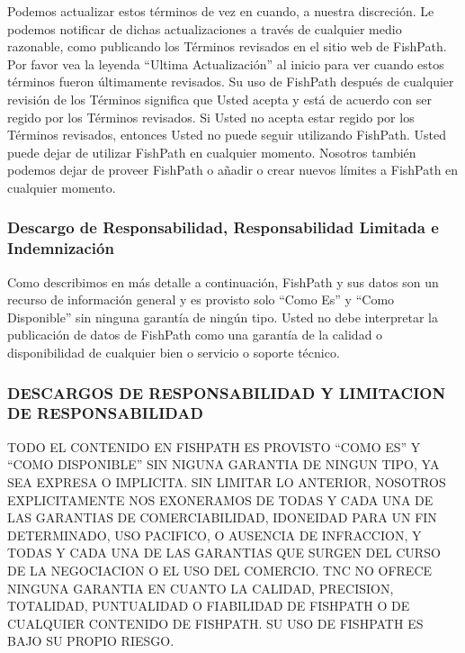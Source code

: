 \documentclass[
  11pt,
]{book}
\begin{document}
Podemos actualizar estos términos de vez en cuando, a nuestra discreción. Le podemos notificar de dichas actualizaciones a través de cualquier medio razonable, como publicando los Términos revisados en el sitio web de FishPath. Por favor vea la leyenda ``Ultima Actualización'' al inicio para ver cuando estos términos fueron últimamente revisados. Su uso de FishPath después de cualquier revisión de los Términos significa que Usted acepta y está de acuerdo con ser regido por los Términos revisados. Si Usted no acepta estar regido por los Términos revisados, entonces Usted no puede seguir utilizando FishPath. Usted puede dejar de utilizar FishPath en cualquier momento. Nosotros también podemos dejar de proveer FishPath o añadir o crear nuevos límites a FishPath en cualquier momento.

\hypertarget{descargo-de-responsabilidad-responsabilidad-limitada-e-indemnizaciuxf3n}{%
\subsubsection*{Descargo de Responsabilidad, Responsabilidad Limitada e Indemnización}\label{descargo-de-responsabilidad-responsabilidad-limitada-e-indemnizaciuxf3n}}

Como describimos en más detalle a continuación, FishPath y sus datos son un recurso de información general y es provisto solo ``Como Es'' y ``Como Disponible'' sin ninguna garantía de ningún tipo. Usted no debe interpretar la publicación de datos de FishPath como una garantía de la calidad o disponibilidad de cualquier bien o servicio o soporte técnico.

\hypertarget{descargos-de-responsabilidad-y-limitacion-de-responsabilidad}{%
\subsubsection*{DESCARGOS DE RESPONSABILIDAD Y LIMITACION DE RESPONSABILIDAD}\label{descargos-de-responsabilidad-y-limitacion-de-responsabilidad}}

TODO EL CONTENIDO EN FISHPATH ES PROVISTO ``COMO ES'' Y ``COMO DISPONIBLE'' SIN NIGUNA GARANTIA DE NINGUN TIPO, YA SEA EXPRESA O IMPLICITA. SIN LIMITAR LO ANTERIOR, NOSOTROS EXPLICITAMENTE NOS EXONERAMOS DE TODAS Y CADA UNA DE LAS GARANTIAS DE COMERCIABILIDAD, IDONEIDAD PARA UN FIN DETERMINADO, USO PACIFICO, O AUSENCIA DE INFRACCION, Y TODAS Y CADA UNA DE LAS GARANTIAS QUE SURGEN DEL CURSO DE LA NEGOCIACION O EL USO DEL COMERCIO. TNC NO OFRECE NINGUNA GARANTIA EN CUANTO LA CALIDAD, PRECISION, TOTALIDAD, PUNTUALIDAD O FIABILIDAD DE FISHPATH O DE CUALQUIER CONTENIDO DE FISHPATH. SU USO DE FISHPATH ES BAJO SU PROPIO RIESGO.
\end{document}
